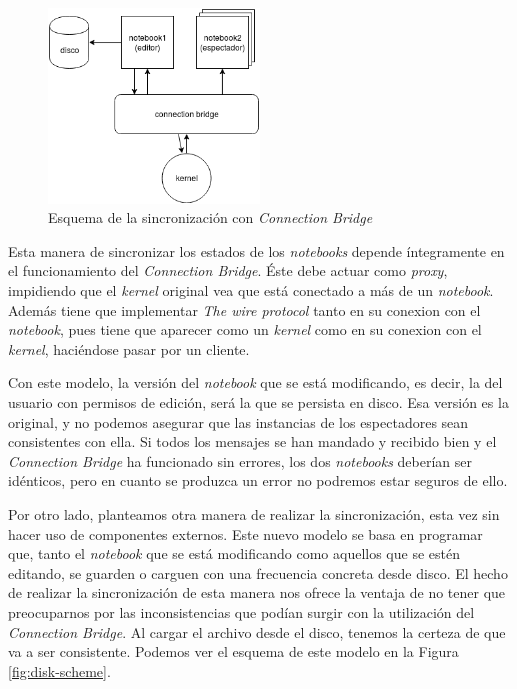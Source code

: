 \documentclass[11pt,spanish,listoffigures]{tfgetsinf}
\begin{document}
\begin{figure}[h]
	\centering
  	\includegraphics[width=0.5\textwidth]{Connection_Bridge.png}
  	\caption{Esquema de la sincronización con \textit{Connection Bridge}}
  	\label{fig:cb-scheme}
\end{figure}

Esta manera de sincronizar los estados de los \textit{notebooks} depende íntegramente en el funcionamiento del \textit{Connection Bridge}. Éste debe actuar como \textit{proxy}, impidiendo que el \textit{kernel} original vea que está conectado a más de un \textit{notebook}. Además tiene que implementar \textit{The wire protocol} \cite{wire-protocol} tanto en su conexion con el \textit{notebook}, pues tiene que aparecer como un \textit{kernel} como en su conexion con el \textit{kernel}, haciéndose pasar por un cliente. 

Con este modelo, la versión del \textit{notebook} que se está modificando, es decir, la del usuario con permisos de edición, será la que se persista en disco. Esa versión es la original, y no podemos asegurar que las instancias de los espectadores sean consistentes con ella. Si todos los mensajes se han mandado y recibido bien y el \textit{Connection Bridge} ha funcionado sin errores, los dos \textit{notebooks} deberían ser idénticos, pero en cuanto se produzca un error no podremos estar seguros de ello.

Por otro lado, planteamos otra manera de realizar la sincronización, esta vez sin hacer uso de componentes externos. Este nuevo modelo se basa en programar que, tanto el \textit{notebook} que se está modificando como aquellos que se estén editando, se guarden o carguen con una frecuencia concreta desde disco. El hecho de realizar la sincronización de esta manera nos ofrece la ventaja de no tener que preocuparnos por las inconsistencias que podían surgir con la utilización del \textit{Connection Bridge}. Al cargar el archivo desde el disco, tenemos la certeza de que va a ser consistente. Podemos ver el esquema de este modelo en la Figura \ref{fig:disk-scheme}.
\end{document}
